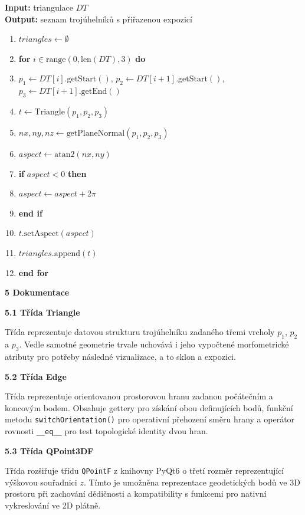 \documentclass[12pt]{article}
\begin{document}
\textbf{Input:} triangulace $DT$ \\
\textbf{Output:} seznam trojúhelníků s přiřazenou expozicí

\begin{enumerate}
    \item $triangles \leftarrow \emptyset$
    \item \textbf{for} $i \in \text{range}(0, \text{len}(DT), 3)$ \textbf{do}
    \item \quad $p_1 \leftarrow DT[i].\text{getStart}()$, $p_2 \leftarrow DT[i+1].\text{getStart}()$, $p_3 \leftarrow DT[i+1].\text{getEnd}()$
    \item \quad $t \leftarrow \text{Triangle}(p_1, p_2, p_3)$
    \item \quad $nx, ny, nz \leftarrow \text{getPlaneNormal}(p_1, p_2, p_3)$
    \item \quad $aspect \leftarrow \text{atan2}(nx, ny)$
    \item \quad \textbf{if} $aspect < 0$ \textbf{then}
    \item \quad \quad $aspect \leftarrow aspect + 2\pi$
    \item \quad \textbf{end if}
    \item \quad $t.\text{setAspect}(aspect)$
    \item \quad $triangles.\text{append}(t)$
    \item \textbf{end for}
\end{enumerate}

\newpage
{\large \textbf{5 Dokumentace}}

\textbf{5.1 Třída Triangle}

Třída reprezentuje datovou strukturu trojúhelníku zadaného třemi vrcholy $p_{1}$, $p_{2}$ a $p_{3}$. Vedle samotné geometrie trvale uchovává i jeho vypočtené morfometrické atributy pro potřeby následné vizualizace, a to sklon a expozici.

\textbf{5.2 Třída Edge}

Třída reprezentuje orientovanou prostorovou hranu zadanou počátečním a koncovým bodem. Obsahuje gettery pro získání obou definujících bodů, funkční metodu \texttt{switchOrientation()} pro operativní přehození směru hrany a operátor rovnosti \texttt{\_\_eq\_\_} pro test topologické identity dvou hran.

\textbf{5.3 Třída QPoint3DF}

Třída rozšiřuje třídu \texttt{QPointF} z knihovny PyQt6 o třetí rozměr reprezentující výškovou souřadnici $z$. Tímto je umožněna reprezentace geodetických bodů ve 3D prostoru při zachování dědičnosti a kompatibility s funkcemi pro nativní vykreslování ve 2D plátně.
\end{document}
